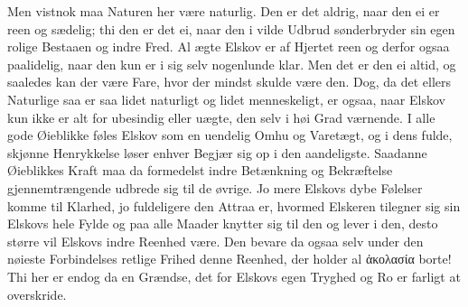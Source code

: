 \documentclass[12pt,a4paper]{book}
\newcommand{\apage}[1]{\marginnote{\footnotesize\textit{[#1]}}}
\begin{document}
Men vistnok maa Naturen her være naturlig. Den er det aldrig, naar den
ei er reen og sædelig; thi den er det ei, naar den i vilde Udbrud
sønderbryder sin egen rolige Bestaaen og indre Fred. Al ægte Elskov er
af Hjertet reen og derfor ogsaa paalidelig, naar den kun er i sig selv
nogenlunde klar. Men det er den ei altid, og saaledes kan der være
Fare, hvor der mindst skulde være den. Dog, da det ellers Naturlige saa
er saa lidet naturligt og lidet menneskeligt, er ogsaa, naar Elskov kun
ikke er alt for ubesindig eller uægte, den selv i høi Grad værnende. I
alle gode Øieblikke føles Elskov som en uendelig Omhu og Varetægt, og i
dens fulde, skjønne Henrykkelse løser enhver Begjær sig op i den
aandeligste. Saadanne Øieblikkes Kraft maa da formedelst indre
Betænkning og Bekræftelse \apage{47} gjennemtrængende udbrede sig til de øvrige. Jo
mere Elskovs dybe Følelser komme til Klarhed, jo fuldeligere den Attraa
er, hvormed Elskeren tilegner sig sin Elskovs hele Fylde og paa alle
Maader knytter sig til den og lever i den, desto større vil Elskovs
indre Reenhed være. Den bevare da ogsaa selv under den nøieste
Forbindelses retlige Frihed denne Reenhed, der holder al ἀκολασία
borte! Thi her er endog da en Grændse, det for Elskovs egen Tryghed og
Ro er farligt at overskride.
\end{document}
